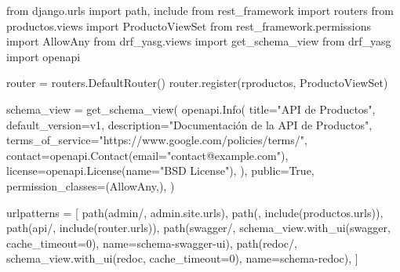 \documentclass[
  a4paper,
  DIV=11,
  numbers=noendperiod,
  onepage,
  openany]{scrreprt}
\newenvironment{Shaded}{\begin{snugshade}}{\end{snugshade}}
\newcommand{\DecValTok}[1]{\textcolor[rgb]{0.68,0.00,0.00}{#1}}
\newcommand{\ImportTok}[1]{\textcolor[rgb]{0.00,0.46,0.62}{#1}}
\newcommand{\NormalTok}[1]{\textcolor[rgb]{0.00,0.23,0.31}{#1}}
\newcommand{\OperatorTok}[1]{\textcolor[rgb]{0.37,0.37,0.37}{#1}}
\newcommand{\StringTok}[1]{\textcolor[rgb]{0.13,0.47,0.30}{#1}}
\newcommand{\VariableTok}[1]{\textcolor[rgb]{0.07,0.07,0.07}{#1}}
\newcommand{\VerbatimStringTok}[1]{\textcolor[rgb]{0.13,0.47,0.30}{#1}}
\begin{document}
\begin{Shaded}
\begin{Highlighting}[]
\ImportTok{from}\NormalTok{ django.urls }\ImportTok{import}\NormalTok{ path, include}
\ImportTok{from}\NormalTok{ rest\_framework }\ImportTok{import}\NormalTok{ routers}
\ImportTok{from}\NormalTok{ productos.views }\ImportTok{import}\NormalTok{ ProductoViewSet}
\ImportTok{from}\NormalTok{ rest\_framework.permissions }\ImportTok{import}\NormalTok{ AllowAny}
\ImportTok{from}\NormalTok{ drf\_yasg.views }\ImportTok{import}\NormalTok{ get\_schema\_view}
\ImportTok{from}\NormalTok{ drf\_yasg }\ImportTok{import}\NormalTok{ openapi}

\NormalTok{router }\OperatorTok{=}\NormalTok{ routers.DefaultRouter()}
\NormalTok{router.register(}\VerbatimStringTok{r\textquotesingle{}productos\textquotesingle{}}\NormalTok{, ProductoViewSet)}

\NormalTok{schema\_view }\OperatorTok{=}\NormalTok{ get\_schema\_view(}
\NormalTok{   openapi.Info(}
\NormalTok{      title}\OperatorTok{=}\StringTok{"API de Productos"}\NormalTok{,}
\NormalTok{      default\_version}\OperatorTok{=}\StringTok{\textquotesingle{}v1\textquotesingle{}}\NormalTok{,}
\NormalTok{      description}\OperatorTok{=}\StringTok{"Documentación de la API de Productos"}\NormalTok{,}
\NormalTok{      terms\_of\_service}\OperatorTok{=}\StringTok{"https://www.google.com/policies/terms/"}\NormalTok{,}
\NormalTok{      contact}\OperatorTok{=}\NormalTok{openapi.Contact(email}\OperatorTok{=}\StringTok{"contact@example.com"}\NormalTok{),}
\NormalTok{      license}\OperatorTok{=}\NormalTok{openapi.License(name}\OperatorTok{=}\StringTok{"BSD License"}\NormalTok{),}
\NormalTok{   ),}
\NormalTok{   public}\OperatorTok{=}\VariableTok{True}\NormalTok{,}
\NormalTok{   permission\_classes}\OperatorTok{=}\NormalTok{(AllowAny,),}
\NormalTok{)}

\NormalTok{urlpatterns }\OperatorTok{=}\NormalTok{ [}
\NormalTok{    path(}\StringTok{\textquotesingle{}admin/\textquotesingle{}}\NormalTok{, admin.site.urls),}
\NormalTok{    path(}\StringTok{\textquotesingle{}\textquotesingle{}}\NormalTok{, include(}\StringTok{\textquotesingle{}productos.urls\textquotesingle{}}\NormalTok{)),}
\NormalTok{    path(}\StringTok{\textquotesingle{}api/\textquotesingle{}}\NormalTok{, include(router.urls)),}
\NormalTok{    path(}\StringTok{\textquotesingle{}swagger/\textquotesingle{}}\NormalTok{, schema\_view.with\_ui(}\StringTok{\textquotesingle{}swagger\textquotesingle{}}\NormalTok{, cache\_timeout}\OperatorTok{=}\DecValTok{0}\NormalTok{), name}\OperatorTok{=}\StringTok{\textquotesingle{}schema{-}swagger{-}ui\textquotesingle{}}\NormalTok{),}
\NormalTok{    path(}\StringTok{\textquotesingle{}redoc/\textquotesingle{}}\NormalTok{, schema\_view.with\_ui(}\StringTok{\textquotesingle{}redoc\textquotesingle{}}\NormalTok{, cache\_timeout}\OperatorTok{=}\DecValTok{0}\NormalTok{), name}\OperatorTok{=}\StringTok{\textquotesingle{}schema{-}redoc\textquotesingle{}}\NormalTok{),}
\NormalTok{]}
\end{Highlighting}
\end{Shaded}
\end{document}
